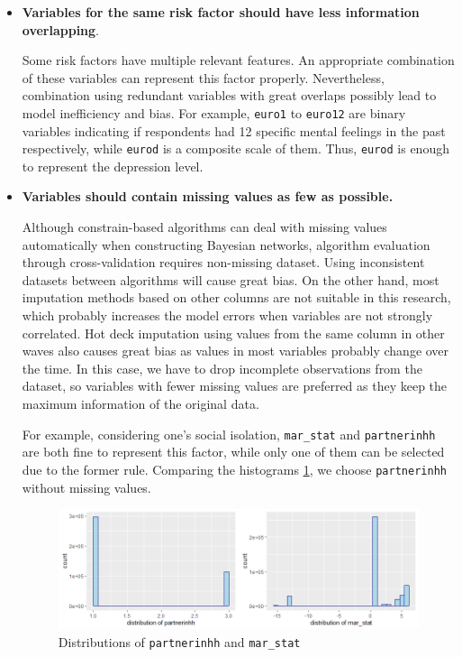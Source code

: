 \documentclass[11pt,twoside]{article}
\numberwithin{Theorem}{section}
\numberwithin{Definition}{section}
\numberwithin{Lemma}{section}
\numberwithin{Algorithm}{section}
\numberwithin{equation}{section}
\begin{document}
\begin{itemize}
	
	\item \textbf{Variables for the same risk factor should have less information overlapping}.
	
	Some risk factors have multiple relevant features. An appropriate combination of these variables can represent this factor properly. Nevertheless, combination using redundant variables with great overlaps possibly lead to model inefficiency and bias. For example, \texttt{euro1} to \texttt{euro12} are binary variables indicating if respondents had 12 specific mental feelings in the past respectively, while \texttt{eurod} is a composite scale of them. Thus, \texttt{eurod} is enough to represent the depression level.
	
	\item \textbf{Variables should contain missing values as few as possible.}
	
	Although constrain-based algorithms can deal with missing values automatically when constructing Bayesian networks, algorithm evaluation through cross-validation requires non-missing dataset. Using inconsistent datasets between algorithms will cause great bias. On the other hand, most imputation methods based on other columns are not suitable in this research, which probably increases the model errors when variables are not strongly correlated. Hot deck imputation using values from the same column in other waves also causes great bias as values in most variables probably change over the time. In this case, we have to drop incomplete observations from the dataset, so variables with fewer missing values are preferred as they keep the maximum information of the original data. 
	
	For example, considering one's social isolation,  \texttt{mar\_stat} and \texttt{partnerinhh} are both fine to represent this factor, while only one of them can be selected due to the former rule. Comparing the histograms \ref{fig:social}, we choose \texttt{partnerinhh} without missing values.
	
	\begin{figure}[!h]
		\centering
		\includegraphics[width = 0.75 \textwidth]{Images/social.png}
		\caption{Distributions of \texttt{partnerinhh} and \texttt{mar\_stat}}
		\label{fig:social}
	\end{figure}
	
\end{itemize}
\end{document}
